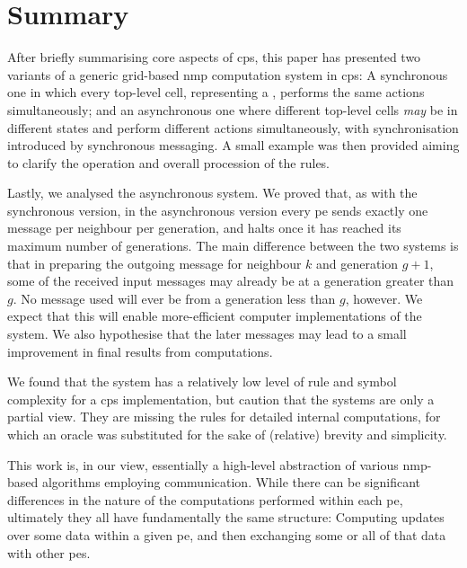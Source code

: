 \section{Summary}
After briefly summarising core aspects of \gls{cps}, this paper has presented two variants of a generic grid-based \gls{nmp} computation system in \gls{cps}:  A synchronous one in which every top-level cell, representing a , performs the same actions simultaneously;  and an asynchronous one where different top-level cells \emph{may} be in different states and perform different actions simultaneously, with synchronisation introduced by synchronous messaging.  A small example was then provided aiming to clarify the operation and overall procession of the rules.

Lastly, we analysed the asynchronous system.  We proved that, as with the synchronous version, in the asynchronous version every \gls{pe} sends exactly one message per neighbour per generation, and halts once it has reached its maximum number of generations.  The main difference between the two systems is that in preparing the outgoing message for neighbour \(k\) and generation \(g + 1\), some of the received input messages may already be at a generation greater than \(g\).  No message used will ever be from a generation less than \(g\), however.  We expect that this will enable more-efficient computer implementations of the system.  We also hypothesise that the later messages may lead to a small improvement in final results from computations.

We found that the system has a relatively low level of rule and symbol complexity for a \gls{cps} implementation, but caution that the systems are only a partial view.  They are missing the rules for detailed internal computations, for which an oracle was substituted for the sake of (relative) brevity and simplicity.

This work is, in our view, essentially a high-level abstraction of various \gls{nmp}-based algorithms employing communication.  While there can be significant differences in the nature of the computations performed within each \gls{pe}, ultimately they all have fundamentally the same structure:  Computing updates over some data within a given \gls{pe}, and then exchanging some or all of that data with other \glspl{pe}.


